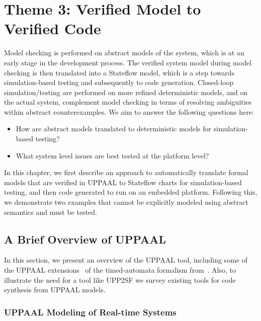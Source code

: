 \chapter{Theme 3: Verified Model to Verified Code}
Model checking is performed on abstract models of the system, which is at an early stage in the development process. The verified system model during model checking is then translated into a Stateflow model, which is a step towards simulation-based testing and subsequently to code generation. Closed-loop simulation/testing are performed on more refined deterministic models, and on the actual system, complement model checking in terms of resolving ambiguities within abstract counterexamples. We aim to answer the following questions here:

\begin{itemize}
	\vspace{-5pt}
	\item How are abstract models translated to deterministic models for simulation-based testing?
	\vspace{-5pt}
	\item What system level issues are best tested at the platform level?
\end{itemize}

In this chapter, we first describe an approach to automatically translate formal models that are verified in UPPAAL to Stateflow charts for simulation-based testing, and then code generated to run on an embedded platform. Following this, we demonstrate two examples that cannot be explicitly modeled using abstract semantics and must be tested.
\section{A Brief Overview of UPPAAL}
\label{sec:uppaal}

In this section, we present an overview of the UPPAAL tool, including some of the UPPAAL extensions~\cite{uppaal,uppaal_tut,uppaal_wang} of the timed-automata formalism from~\cite{timed-aut}. Also, to illustrate the need for a tool like UPP2SF we survey existing tools for code synthesis from UPPAAL models.

\subsection{UPPAAL Modeling of Real-time Systems}

